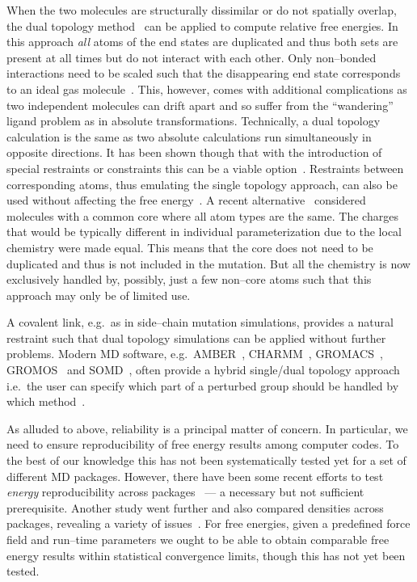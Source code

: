 \documentclass[journal=jctcce,manuscript=article]{achemso}
\begin{document}
When the two molecules are structurally dissimilar or do not spatially overlap, 
the dual topology method~\cite{doi:10.1021/j100056a020, doi:10.1021/jp981628n} 
can be applied to compute relative free energies.  In this approach \emph{all} 
atoms of the end states are duplicated and thus both sets are present at all
times but do not interact with each other.  Only non--bonded
interactions need to be scaled such that the disappearing end state
corresponds to an ideal gas molecule~\cite{doi:10.1021/jp981628n}.
This, however, comes with additional complications as two independent
molecules can drift apart and so suffer from the ``wandering'' ligand
problem as in absolute transformations\cite{GILSON19971047,
doi:10.1021/jp0217839, deng_computations_2009}.  Technically, a dual topology 
calculation is the same as two absolute calculations run simultaneously in 
opposite directions.  It has been shown though that with the introduction of 
special restraints or constraints this can be a viable 
option~\cite{doi:10.1021/ct700081t,  rocklin_separated_2013, JCC:Axelsen-Li}.  
Restraints between corresponding atoms, thus emulating the single topology 
approach, can also be used without affecting the free 
energy~\cite{JCC:Axelsen-Li}.  A recent 
alternative~\cite{doi:10.1021/acs.jctc.5b00179} considered molecules with a
common core where all atom types are the same.  The charges that would be 
typically different in individual parameterization due to the local chemistry
were made equal.  This means that the core does not need to be duplicated and 
thus is not included in the mutation.  But all the chemistry is now exclusively 
handled by, possibly, just a few non--core atoms such that this approach may 
only be of limited use.

A covalent link, e.g.\ as in side--chain mutation simulations, provides a 
natural restraint such that dual topology simulations can be applied without 
further problems.  Modern MD software, e.g.\ AMBER~\cite{case_amber_2005},
CHARMM~\cite{JCC:JCC21287}, GROMACS~\cite{Abraham201519},
GROMOS~\cite{doi:10.1021/jp984217f} and SOMD~\cite{Sire-2016,
  doi:10.1021/ct300857j}, often provide a hybrid single/dual topology approach
i.e.\ the user can specify which part of a perturbed group should be handled by 
which method~\cite{doi:10.1021/jp994193s}.

As alluded to above, reliability is a principal matter of concern.  In
particular, we need to ensure reproducibility of free energy results
among computer codes.  To the best of our knowledge this has not been
systematically tested yet for a set of different MD packages. 
However, there have been some recent efforts to test \emph{energy} 
reproducibility across packages~\cite{Shirts2017} --- a necessary but not 
sufficient prerequisite.  Another study went further and also compared 
densities across packages, revealing a variety of 
issues~\cite{doi:10.1021/acs.jctc.7b00489}.
For free energies, given a predefined force field and run--time parameters we 
ought to be able to obtain comparable free energy results within statistical 
convergence limits, though this has not yet been tested.
\end{document}
